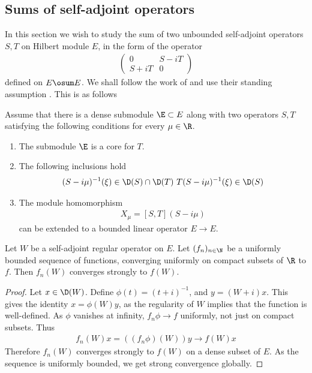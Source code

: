 \subsection{Sums of self-adjoint operators}
In this section we wish to study the sum of two unbounded self-adjoint operators $S,T$ on Hilbert \Cstar module $E$, in the form of the operator 
\begin{align*}
\begin{pmatrix}
	0 & S-iT \\
	S+iT & 0
\end{pmatrix}
\end{align*}
defined on $E\osum E$. 
We shall follow the work of \cite{locglob} and use their standing assumption \cite[Assumption 7.1]{locglob}. This is as follows
\begin{assumption}\label{standassump}
	Assume that there is a dense submodule $\E\subset E$ along with two operators $S,T$  satisfying the following conditions for every $\mu \in \R$. 
	\begin{enumerate}
		\item
			The submodule $\E$ is a core for $T$.
		\item
			The following inclusions hold
			\begin{align*}
				(S-i\mu)^{-1}(\xi)\in \D(S)\cap \D(T) ~ T(S-i\mu)^{-1}(\xi)\in \D(S)
			\end{align*}
		\item
			The module homomorphism 
			\begin{align*}
				X_\mu=[S,T](S-i\mu)
			\end{align*}
			can be extended to a bounded linear operator $E\to E$.
	\end{enumerate}
\end{assumption}
\begin{lemma}\label{strongconvsa}
	Let $W$ be a self-adjoint regular operator on $E$. Let $(f_n)_{n\in\N}$ be a uniformly bounded sequence of functions, converging uniformly on compact subsets of $\R$ to $f$. 
	Then $f_n(W)$ converges strongly to $f(W)$. 
\end{lemma}
\begin{proof}
	Let $x\in \D(W)$. Define $\phi(t)=(t+i)^{-1}$, and $y=(W+i)x$. This gives the identity $x=\phi(W)y$, as the regularity of $W$ implies that the function is well-defined. As $\phi$ vanishes at infinity, $f_n\phi\to f$ uniformly, not just on compact subsets. Thus
	\begin{align*}
		f_n(W)x=((f_n\phi)(W))y\to f(W)x
	\end{align*}
	Therefore $f_n(W)$ converges strongly to $f(W)$ on a dense subset of $E$. As the sequence is uniformly bounded, we get strong convergence globally. 
\end{proof}
